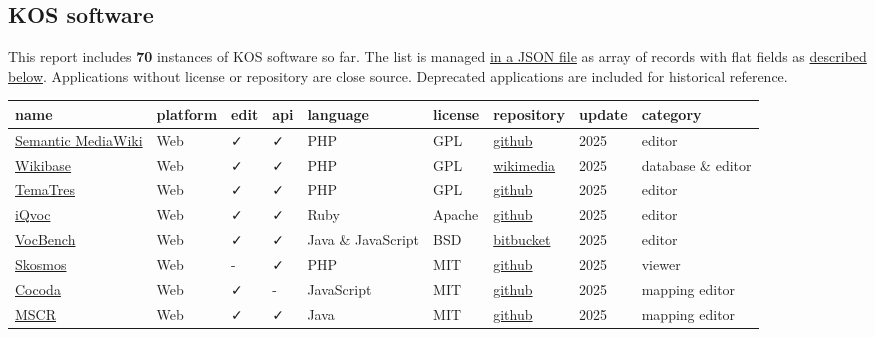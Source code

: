 \documentclass[
  DIV=10]{article}
\begin{document}
\newpage
{}
\recalctypearea

\subsection{KOS software}\label{kos-software}

This report includes \textbf{70} instances of KOS software so far. The
list is managed \href{kos-software.json}{in a JSON file} as array of
records with flat fields as \hyperref[metadata]{described below}.
Applications without license or repository are close source. Deprecated
applications are included for historical reference.

\label{tbl-software}
\begin{longtable}[]{@{}lllllllll@{}}
\toprule\noalign{}
name & platform & edit & api & language & license & repository & update
& category \\
\midrule\noalign{}
\endhead
\bottomrule\noalign{}
\endlastfoot
\href{https://www.semantic-mediawiki.org/}{Semantic MediaWiki} & Web & ✓
& ✓ & PHP & GPL &
\href{https://github.com/SemanticMediaWiki/SemanticMediaWiki/}{github} &
2025 & editor \\
\href{http://wikiba.se/}{Wikibase} & Web & ✓ & ✓ & PHP & GPL &
\href{https://gerrit.wikimedia.org/g/mediawiki/extensions/Wikibase}{wikimedia}
& 2025 & database \& editor \\
\href{https://vocabularyserver.com/web/}{TemaTres} & Web & ✓ & ✓ & PHP &
GPL &
\href{https://github.com/tematres/TemaTres-Vocabulary-Server}{github} &
2025 & editor \\
\href{https://iqvoc.net/}{iQvoc} & Web & ✓ & ✓ & Ruby & Apache &
\href{https://github.com/innoq/iqvoc}{github} & 2025 & editor \\
\href{https://vocbench.uniroma2.it/}{VocBench} & Web & ✓ & ✓ & Java \&
JavaScript & BSD &
\href{https://bitbucket.org/art-uniroma2/vocbench3/src/master/}{bitbucket}
& 2025 & editor \\
\href{https://skosmos.org/}{Skosmos} & Web & - & ✓ & PHP & MIT &
\href{https://github.com/NatLibFi/Skosmos}{github} & 2025 & viewer \\
\href{https://coli-conc.gbv.de/cocoda/}{Cocoda} & Web & ✓ & - &
JavaScript & MIT & \href{https://github.com/gbv/cocoda}{github} & 2025 &
mapping editor \\
\href{https://cscfi.github.io/mscr-docs/}{MSCR} & Web & ✓ & ✓ & Java &
MIT & \href{https://github.com/CSCfi/mscr-compose}{github} & 2025 &
mapping editor \\

\end{longtable}
\end{document}
